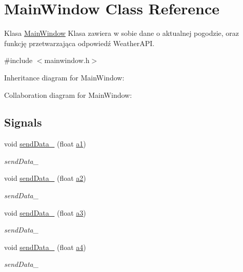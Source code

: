 \hypertarget{class_main_window}{}\section{Main\+Window Class Reference}
\label{class_main_window}


Klasa \hyperlink{class_main_window}{Main\+Window} Klasa zawiera w sobie dane o aktualnej pogodzie, oraz funkcję przetwarzająca odpowiedź Weather\+A\+PI.  




{\ttfamily \#include $<$mainwindow.\+h$>$}



Inheritance diagram for Main\+Window\+:


Collaboration diagram for Main\+Window\+:
\subsection*{Signals}
\begin{DoxyCompactItemize}
\item 
void \hyperlink{class_main_window_aaa0e90647372b46a538c32dc8013fa72}{send\+Data\+\_} (float \hyperlink{glwidget_8cpp_ad36c8f7a507294aa8f53bb0baf28fb24}{a1})
\begin{DoxyCompactList}\small\item\em send\+Data\+\_ \end{DoxyCompactList}\item 
void \hyperlink{class_main_window_a5d2d118cbfdd9009c99d20bcb3985ecb}{send\+Data\+\_} (float \hyperlink{glwidget_8cpp_a0a9ef35b787a9d8a73482c238d0177c4}{a2})
\begin{DoxyCompactList}\small\item\em send\+Data\+\_ \end{DoxyCompactList}\item 
void \hyperlink{class_main_window_afa13ec675395ccd35c4aa4e40664e22b}{send\+Data\+\_} (float \hyperlink{glwidget_8cpp_a121924f04becfe5b45345db8405e3df7}{a3})
\begin{DoxyCompactList}\small\item\em send\+Data\+\_ \end{DoxyCompactList}\item 
void \hyperlink{class_main_window_a37b6add722d1d8979d057d4ff7cfb356}{send\+Data\+\_} (float \hyperlink{glwidget_8cpp_a9ed6e295435b3fd00fb905a563402691}{a4})
\begin{DoxyCompactList}\small\item\em send\+Data\+\_ \end{DoxyCompactList}\end{DoxyCompactItemize}
